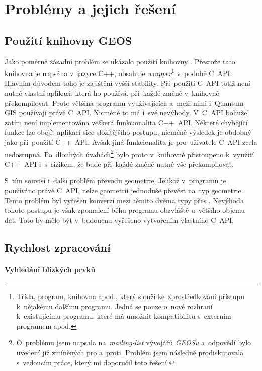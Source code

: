 \chapter{Problémy a jejich řešení}
\label{7-problemy}

\section{Použití knihovny GEOS}
\label{problemy-geos}
Jako poměrně zásadní problém se ukázalo použití knihovny . 
Přestože tato knihovna je napsána v~jazyce C++, obsahuje 
\textit{wrapper}\footnote{Třída, program, knihovna apod., který slouží 
ke~zprostředkování přístupu k~nějakému dalšímu programu. Jedná se pouze 
o~nové rozhraní k~existujícímu programu, které má umožnit kompatibilitu
s~externím programem apod.} v~podobě C~API. Hlavním důvodem toho je 
zajištění vyšší stability. Při~použití C~API totiž není nutné vlastní 
aplikaci, která ho používá, při~každé změně v~knihovně  překompilovat. 
Proto většina programů využívajících  a~mezi nimi i~Quantum 
GIS používají právě C~API. Nicméně to má i~své nevýhody. V~C~API bohužel 
zatím není implementována veškerá funkcionalita C++~API. Některé chybějící 
funkce lze obejít aplikací sice složitějšího postupu, nicméně výsledek je 
obdobný jako při~použití C++~API. Avšak jiná funkcionalita je pro~uživatele 
C~API zcela nedostupná. Po~dlouhých úvahách\footnote{O~problému jsem napsala
na~\textit{mailing-list} vývojářů \textit{GEOSu} a~odpovědí bylo uvedení 
již zmíněných pro a~proti. Problém jsem následně prodiskutovala s~vedoucím 
práce, který mi doporučil toto řešení.} bylo proto v~knihovně  
přistoupeno k~využití C++~API i~s~rizikem, že bude při~každé změně nutné 
vše překompilovat. 

S~tím souvisí i~další problém převodu geometrie. Jelikož v~programu  
je používáno právě C~API, nelze  geometrii jednoduše převést na~typ 
 geometrie. Tento problém byl vyřešen konverzí mezi těmito dvěma
typy přes . Nevýhoda tohoto postupu je však zpomalení běhu programu 
obzvláště u~většího objemu dat. Toto by mělo být v~budoucnu vyřešeno 
vytvořením vlastního C~API.


\section{Rychlost zpracování}
\label{problemy-rychlost}

\subsubsection{Vyhledání blízkých prvků}

